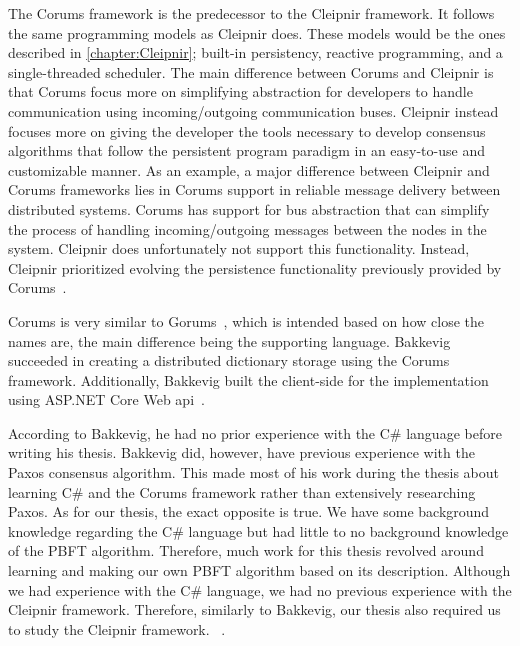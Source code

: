 The Corums framework is the predecessor to the Cleipnir framework. It follows the same programming models as Cleipnir does. These models would be the ones described in \autoref{chapter:Cleipnir}; built-in persistency, reactive programming, and a single-threaded scheduler.
The main difference between Corums and Cleipnir is that Corums focus more on simplifying abstraction for developers to handle communication using incoming/outgoing communication buses. Cleipnir instead focuses more on giving the developer the tools necessary to develop consensus algorithms that follow the persistent program paradigm in an easy-to-use and customizable manner. As an example, a major difference between Cleipnir and Corums frameworks lies in Corums support in reliable message delivery between distributed systems. Corums has support for bus abstraction that can simplify the process of handling incoming/outgoing messages between the nodes in the system. Cleipnir does unfortunately not support this functionality. Instead, Cleipnir prioritized evolving the persistence functionality previously provided by Corums~\cites[p.~6-7]{PAPER:PaxosCleipnir}{DOC:Cleipnir}.
 
Corums is very similar to Gorums~\cites[p.~2]{WEB:Gorums}[p.~22]{PAPER:EivindPaper}, which is intended based on how close the names are, the main difference being the supporting language.
Bakkevig succeeded in creating a distributed dictionary storage using the Corums framework. Additionally, Bakkevig built the client-side for the implementation using ASP.NET Core Web \ac{api}~\cite{WEB:ASPNetCoreAPI}.
 
According to Bakkevig, he had no prior experience with the C\# language before writing his thesis. Bakkevig did, however, have previous experience with the Paxos consensus algorithm. This made most of his work during the thesis about learning C\# and the Corums framework rather than extensively researching Paxos. As for our thesis, the exact opposite is true. We have some background knowledge regarding the C\# language but had little to no background knowledge of the PBFT algorithm. Therefore, much work for this thesis revolved around learning and making our own PBFT algorithm based on its description. Although we had experience with the C\# language, we had no previous experience with the Cleipnir framework. Therefore, similarly to Bakkevig, our thesis also required us to study the Cleipnir framework. ~\cite[p.~8]{PAPER:EivindPaper}.
